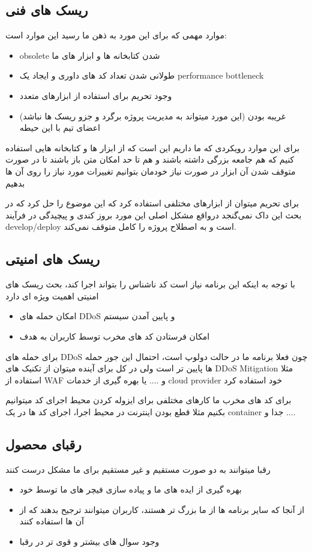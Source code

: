 \documentclass{article}
\begin{document}
		\subsection{ریسک های فنی}
		موارد مهمی که برای این مورد به ذهن ما رسید این موارد است:
		\begin{itemize}
			\item obsolete شدن کتابخانه ها و ابزار های ما
			\item طولانی شدن تعداد کد های داوری و ایجاد یک performance bottleneck
			\item وجود تحریم برای استفاده از ابزارهای متعدد
			\item (این مورد میتواند به مدیریت پروژه برگرد و جزو ریسک ها نباشد) غریبه بودن اعضای تیم با این حیطه
		\end{itemize}
		
		برای این موارد رویکردی که ما داریم این است که از ابزار ها و کتابخانه هایی استفاده کنیم که هم جامعه بزرگی داشته باشند و هم تا حد امکان متن باز باشند تا در صورت متوقف شدن آن ابزار در صورت نیاز خودمان بتوانیم تغییرات مورد نیاز را روی آن ها بدهیم
		
		برای تحریم میتوان از ابزارهای مختلفی استفاده کرد که این موضوع را حل کرد که در بحث این داک نمی‌گنجد درواقع مشکل اصلی این مورد بروز کندی و پیچیدگی در فرآیند develop/deploy است و به اصطلاح پروژه را کامل متوقف نمی‌کند.
		\subsection{ریسک های امنیتی}
		با توجه به اینکه این برنامه نیاز است کد ناشناس را بتواند اجرا کند، بحث ریسک های امنیتی اهمیت ویژه ای دارد
		\begin{itemize}
			\item امکان حمله های DDoS و پایین آمدن سیستم
			\item امکان فرستادن کد های مخرب توسط کاربران به هدف 
		\end{itemize}
		
		برای حمله های DDoS چون فعلا برنامه ما در حالت دولوپ است، احتمال این جور حمله ها پایین تر است ولی در کل برای آینده میتوان از تکنیک های DDoS Mitigation مثلا استفاده از WAF و .... یا بهره گیری از خدمات cloud provider خود استفاده کرد
		
		برای کد های مخرب ما کارهای مختلفی برای ایزوله کردن محیط اجرای کد میتوانیم بکنیم مثلا قطع بودن اینترنت در محیط اجرا، اجرای کد ها در یک container جدا و ....
		
		\subsection{رقبای محصول}
		رقبا میتوانند به دو صورت مستقیم و غیر مستقیم برای ما مشکل درست کنند
		\begin{itemize}
			\item بهره گیری از ایده های ما و پیاده سازی فیچر های ما توسط خود
			\item  از آنجا که سایر برنامه ها از ما بزرگ تر هستند، کاربران میتوانند ترجیح بدهند که از آن ها استفاده کنند
			\item وجود سوال های بیشتر و قوی تر در رقبا
		\end{itemize}
		
\end{document}
